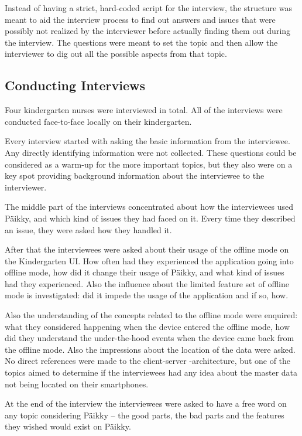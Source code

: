 Instead of having a strict, hard-coded script for the interview, the structure was meant to aid the interview process to find out answers and issues that were possibly not realized by the interviewer before actually finding them out during the interview. The questions were meant to set the topic and then allow the interviewer to dig out all the possible aspects from that topic.



\subsection{Conducting Interviews}

Four kindergarten nurses were interviewed in total. All of the interviews were conducted face-to-face locally on their kindergarten. 

Every interview started with asking the basic information from the interviewee. Any directly identifying information were not collected. These questions could be considered as a warm-up for the more important topics, but they also were on a key spot providing background information about the interviewee to the interviewer. 

The middle part of the interviews concentrated about how the interviewees used Päikky, and which kind of issues they had faced on it. Every time they described an issue, they were asked how they handled it.

After that the interviewees were asked about their usage of the offline mode on the Kindergarten UI. How often had they experienced the application going into offline mode, how did it change their usage of Päikky, and what kind of issues had they experienced. Also the influence about the limited feature set of offline mode is investigated: did it impede the usage of the application and if so, how.

Also the understanding of the concepts related to the offline mode were enquired: what they considered happening when the device entered the offline mode, how did they understand the under-the-hood events when the device came back from the offline mode. Also the impressions about the location of the data were asked. No direct references were made to the client-server -architecture, but one of the topics aimed to determine if the interviewees had any idea about the master data not being located on their smartphones.

At the end of the interview the interviewees were asked to have a free word on any topic considering Päikky – the good parts, the bad parts and the features they wished would exist on Päikky.

